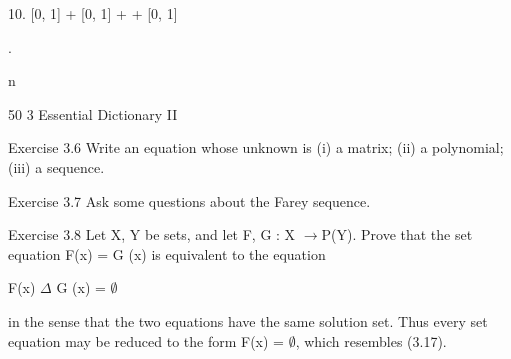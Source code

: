 \documentclass[11pt]{article}
\theoremstyle{plain}
\theoremstyle{definition}
\begin{document}
10. [0, 1] + [0, 1] + \textperiodcentered{} \textperiodcentered{} \textperiodcentered{} + [0, 1]

.

n

50 3 Essential Dictionary II

Exercise 3.6 Write an equation whose unknown is (i) a matrix; (ii) a polynomial; (iii) a sequence.

Exercise 3.7 Ask some questions about the Farey sequence.

Exercise 3.8 Let X, Y be sets, and let F, G : X $\to$P(Y). Prove that the set equation F(x) = G (x) is equivalent to the equation

F(x) $\Delta$ G (x) = $\emptyset$

in the sense that the two equations have the same solution set. Thus every set equation may be reduced to the form F(x) = $\emptyset$, which resembles (3.17).
\end{document}
